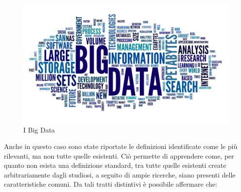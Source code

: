 \begin{figure}[h!]
    \centering
    \includegraphics[width=0.75\linewidth]{figure/capitolo_2/Big_Data.pdf}
    \caption{I Big Data}
    \label{fig:Big_Data}
\end{figure}

Anche in questo caso sono state riportate le definizioni identificate come le più rilevanti, ma non tutte quelle esistenti. Ciò permette di apprendere come, per quanto non esista una definizione standard, tra tutte quelle esistenti create arbitrariamente dagli studiosi, a seguito di ampie ricerche, siano presenti delle caratteristiche comuni. Da tali tratti distintivi è possibile affermare che:

